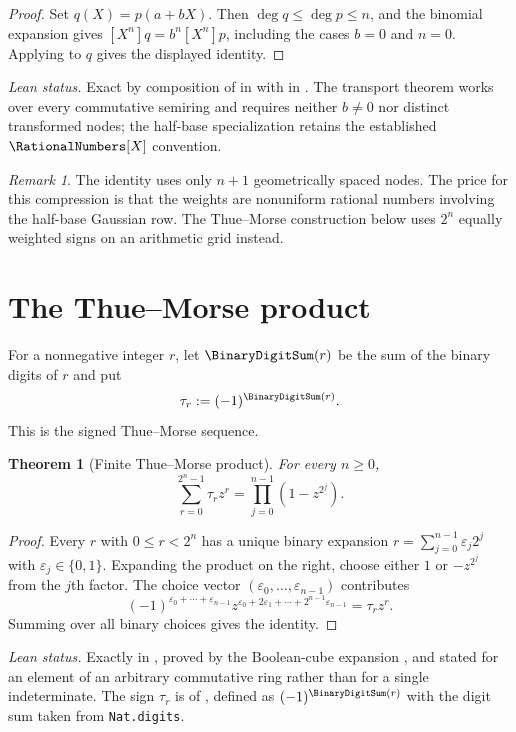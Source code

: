\documentclass[11pt,a4paper,oneside,openany]{book}
\newtheorem{theorem}{Theorem}[chapter]
\theoremstyle{definition}
\theoremstyle{remark}
\newtheorem{remark}[remark]{Remark}
\begin{document}
\begin{proof}
Set $q(X)=p(a+bX)$.  Then $\deg q\leq\deg p\leq n$, and the binomial
expansion gives $[X^n]q=b^n[X^n]p$, including the cases $b=0$ and $n=0$.
Applying  to $q$ gives the displayed identity.
\end{proof}
\emph{Lean status.}  Exact by composition of
 in
 with
 in
.  The transport theorem works over every
commutative semiring and requires neither $b\ne0$ nor distinct transformed
nodes; the half-base specialization retains the established
$\RationalNumbers[X]$ convention.

\begin{remark}
The identity uses only $n+1$ geometrically spaced nodes.  The price for this compression is that the weights are nonuniform rational numbers involving the half-base Gaussian row.  The Thue--Morse construction below uses $2^n$ equally weighted signs on an arithmetic grid instead.
\end{remark}

\section{The Thue--Morse product}

For a nonnegative integer $r$, let $\BinaryDigitSum(r)$ be the sum of the binary digits of $r$ and put
\[
 \tau_r:=(-1)^{\BinaryDigitSum(r)}.
\]
This is the signed Thue--Morse sequence.

\begin{theorem}[Finite Thue--Morse product]\label{thm:thue-morse-product}
For every $n\ge0$,
\begin{equation}\label{eq:thue-morse-product}
 \sum_{r=0}^{2^n-1}\tau_r z^r
 =\prod_{j=0}^{n-1}(1-z^{2^j}).
\end{equation}
\end{theorem}

\begin{proof}
Every $r$ with $0\le r<2^n$ has a unique binary expansion
$r=\sum_{j=0}^{n-1}\varepsilon_j2^j$ with $\varepsilon_j\in\{0,1\}$.  Expanding the product on the right, choose either $1$ or $-z^{2^j}$ from the $j$th factor.  The choice vector $(\varepsilon_0,\ldots,\varepsilon_{n-1})$ contributes
\[
 (-1)^{\varepsilon_0+\cdots+\varepsilon_{n-1}}
 z^{\varepsilon_0+2\varepsilon_1+\cdots+2^{n-1}\varepsilon_{n-1}}
 =\tau_rz^r.
\]
Summing over all binary choices gives the identity.
\end{proof}
\emph{Lean status.}  Exactly  in
, proved by the Boolean-cube expansion
, and stated for an element of an arbitrary
commutative ring rather than for a single indeterminate.  The sign \(\tau_r\) is
 of , defined as \((-1)^{\BinaryDigitSum(r)}\) with
the digit sum taken from \texttt{Nat.digits}.
\end{document}
